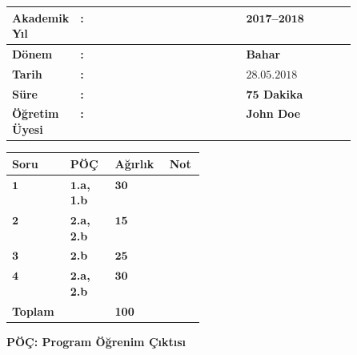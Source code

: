 \documentclass[a4paper, 11pt]{article}
\begin{document}
	\begin{table}[!ht]
		\renewcommand{\arraystretch}{1.5}
		\centering
		\begin{tabular}{@{}|>{\bfseries}L{0.175\linewidth}>{\bfseries}C{0.00\linewidth}>{\bfseries}L{0.32\linewidth}|@{}}
			\hline
			Akademik Yıl  & : & $\bm{2017}$--$\bm{2018}$                     \\ \hline
			Dönem         & : & \textbf{Bahar}                     \\ \hline
			Tarih         & : & $\bm{28.05.2018}$                       \\ \hline
			Süre          & : & $\bm{75}$ \textbf{Dakika}               \\ \hline
			Öğretim Üyesi & : & \textbf{John Doe}\\ \hline
		\end{tabular}
		\hfill
		\renewcommand{\arraystretch}{1.1}
		\begin{tabular}{|>{\bfseries}C{0.08\linewidth}|>{\bfseries}C{0.09\linewidth}|>{\bfseries}C{0.07\linewidth}|>{\bfseries}C{0.04\linewidth}|}
			\hline
			Soru   & PÖÇ      & Ağırlık & Not \\ \hline
			$\bm{1}$ & $\bm{1}$.a, 1.b & $\bm{30}$    & ~   \\ \hline
			$\bm{2}$ & $\bm{2}$.a, 2.b & $\bm{15}$    & ~   \\ \hline
			$\bm{3}$ & $\bm{2}$.b      & $\bm{25}$    & ~   \\ \hline
			$\bm{4}$ & $\bm{2}$.a, 2.b & $\bm{30}$    & ~   \\ \hline
			Toplam & ~        & 100     & ~   \\ \hline
		\end{tabular}
		\vspace{-0.5cm}
		\begin{flushright}
			\textbf{PÖÇ: Program Öğrenim Çıktısı}
		\end{flushright}
	\end{table}
	\vspace{-1cm}
	
\end{document}
